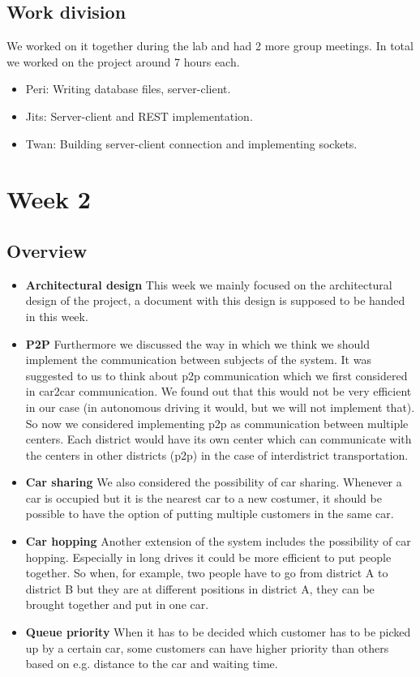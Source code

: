 \documentclass[a4paper]{article}
\begin{document}
\subsection*{Work division}
We worked on it together during the lab and had 2 more group meetings. In total we worked on the project around 7 hours each. 
\begin{itemize}
    \item Peri: Writing database files, server-client.
    \item Jits: Server-client and REST implementation.
    \item Twan: Building server-client connection and implementing sockets.
\end{itemize}


\section*{Week 2}
\subsection*{Overview}
\begin{itemize}
	\item \textbf{Architectural design} This week we mainly focused on the architectural design of the project, a document with this design is supposed to be handed in this week.
	\item \textbf{P2P}  Furthermore we discussed the way in which we think we should implement the communication between subjects of the system. It was suggested to us to think about p2p communication which we first considered in car2car communication. We found out that this would not be very efficient in our case (in autonomous driving it would, but we will not implement that). So now we considered implementing p2p as communication between multiple centers. Each district would have its own center which can communicate with the centers in other districts (p2p) in the case of interdistrict transportation.  
	\item \textbf{Car sharing} We also considered the possibility of car sharing. Whenever a car is occupied but it is the nearest car to a new costumer, it should be possible to have the option of putting multiple customers in the same car. 
	\item \textbf{Car hopping} Another extension of the system includes the possibility of car hopping. Especially in long drives it could be more efficient to put people together. So when, for example, two people have to go from district A to district B but they are at different positions in district A, they can be brought together and put in one car.
	\item \textbf{Queue priority} When it has to be decided which customer has to be picked up by a certain car, some customers can have higher priority than others based on e.g. distance to the car and waiting time. 
	
\end{itemize}
\end{document}
